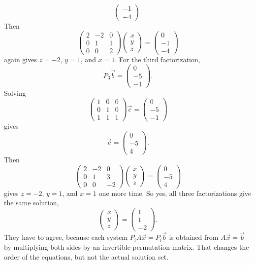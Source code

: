\documentclass[10pt]{extarticle}
\begin{document}
\begin{enumerate}[label=(\alph*)]
\[\begin{pmatrix}
-1\\
-4
\end{pmatrix}.
\]
Then
\[
\begin{pmatrix}
2 & -2 & 0\\
0 & 1 & 1\\
0 & 0 & 2
\end{pmatrix}
\begin{pmatrix}
x\\
y\\
z
\end{pmatrix}
=
\begin{pmatrix}
0\\
-1\\
-4
\end{pmatrix}
\]
again gives $z=-2$, $y=1$, and $x=1$. For the third factorization,
\[
P_3\vec{b}=
\begin{pmatrix}
0\\
-5\\
-1
\end{pmatrix}.
\]
Solving
\[
\begin{pmatrix}
1 & 0 & 0\\
0 & 1 & 0\\
1 & 1 & 1
\end{pmatrix}
\vec{c}
=
\begin{pmatrix}
0\\
-5\\
-1
\end{pmatrix}
\]
gives
\[
\vec{c}=
\begin{pmatrix}
0\\
-5\\
4
\end{pmatrix}.
\]
Then
\[
\begin{pmatrix}
2 & -2 & 0\\
0 & 1 & 3\\
0 & 0 & -2
\end{pmatrix}
\begin{pmatrix}
x\\
y\\
z
\end{pmatrix}
=
\begin{pmatrix}
0\\
-5\\
4
\end{pmatrix}
\]
gives $z=-2$, $y=1$, and $x=1$ one more time. So yes, all three factorizations give the same solution,
\[
\boxed{
\begin{pmatrix}
x\\
y\\
z
\end{pmatrix}
=
\begin{pmatrix}
1\\
1\\
-2
\end{pmatrix}}.
\]
They have to agree, because each system $P_iA\vec{x}=P_i\vec{b}$ is obtained from $A\vec{x}=\vec{b}$ by multiplying both sides by an invertible permutation matrix. That changes the order of the equations, but not the actual solution set.
\end{enumerate}
\end{document}
